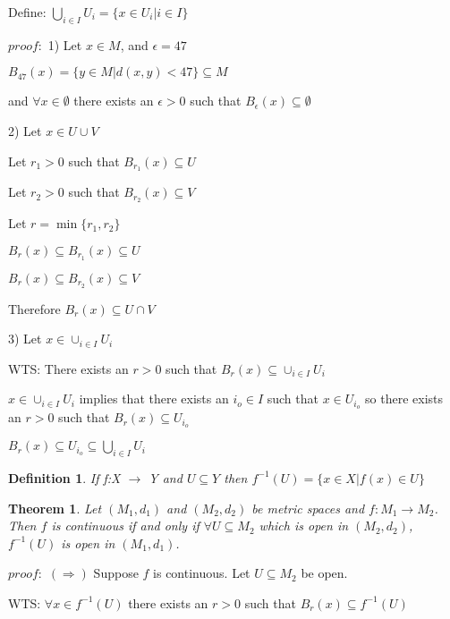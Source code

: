 \documentclass{article}
\newtheorem{Thm}{Theorem}
\newtheorem{Def}{Definition}
\begin{document}
Define: $\bigcup_{i \in I} U_i = \{x \in U_i | i \in I\}$

$proof:$
1) Let $x\in M$, and $\epsilon = 47$

$B_{47} (x) = \{y\in M|d(x,y)<47\} \subseteq M$

and $\forall x\in \emptyset$ there exists an $\epsilon >0$ such that $B_\epsilon (x) \subseteq \emptyset$

\medskip

2) Let $x\in U\cup V$

Let $r_1 >0$ such that $B_{r_1} (x) \subseteq U$

Let $r_2 >0$ such that $B_{r_2} (x) \subseteq V$

Let $r = \min\{r_1, r_2 \}$

$B_r (x) \subseteq B_{r_1} (x) \subseteq U$

$B_r (x) \subseteq B_{r_2} (x) \subseteq V$

Therefore $B_r (x) \subseteq U \cap V$

\medskip

3) Let $x \in \cup_{i\in I} U_i$

WTS: There exists an $r>0$ such that $B_r (x) \subseteq \cup_{i\in I} U_i$

$x\in \cup_{i\in I} U_i$ implies that there exists an $i_o \in I$ such that $x\in U_{i_o}$ so there exists an $r>0$ such that $B_r (x) \subseteq U_{i_o}$

$B_r (x) \subseteq U_{i_o} \subseteq \bigcup_{i\in I} U_i$


\medskip

\begin{Def}

If f:X $\rightarrow$ Y and $U \subseteq Y$ then $f^{-1} (U) = \{x\in X |f(x) \in U\}$

\end{Def}

\begin{Thm}

Let $(M_1, d_1)$ and $(M_2, d_2)$ be metric spaces and $f: M_1 \rightarrow M_2$. Then $f$ is continuous if and only if $\forall U \subseteq M_2$ which is open in $(M_2,
d_2)$, $f^{-1} (U)$ is open in $(M_1, d_1)$.

\end{Thm}

$proof:$
$(\Rightarrow)$ Suppose $f$ is continuous. Let $U \subseteq M_2$ be open.

WTS: $\forall x \in f^{-1} (U)$ there exists an $r>0$ such that $B_r (x) \subseteq f^{-1} (U)$
\end{document}
